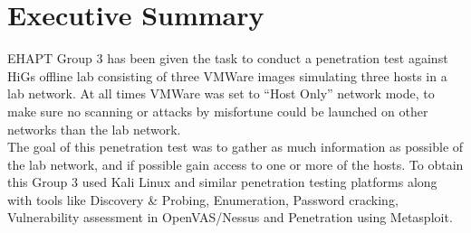 \section{Executive Summary}

EHAPT Group 3 has been given the task to conduct a penetration test against HiGs offline lab consisting of three VMWare images simulating three hosts in a lab network. At all times VMWare was set to “Host Only” network mode, to make sure no scanning or attacks by misfortune could be launched on other networks than the lab network.\\
The goal of this penetration test was to gather as much information as possible of the lab network, and if possible gain access to one or more of the hosts. To obtain this Group 3 used Kali Linux and similar penetration testing platforms along with tools like Discovery \& Probing, Enumeration, Password cracking, Vulnerability assessment in OpenVAS/Nessus and Penetration using Metasploit.
